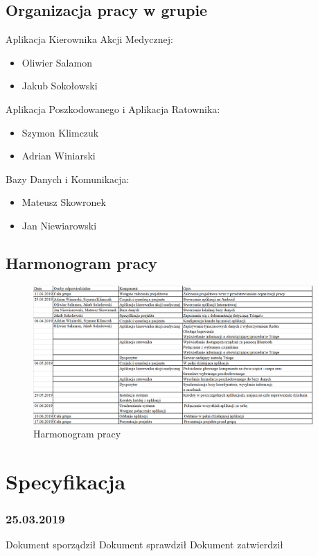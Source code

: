 \documentclass[11pt]{report}
\begin{document}
\subsection{Organizacja pracy w grupie}
Aplikacja Kierownika Akcji Medycznej:
\begin{itemize}
    \item Oliwier Salamon
    \item Jakub Sokołowski
\end{itemize}
Aplikacja Poszkodowanego i Aplikacja Ratownika:
\begin{itemize}
    \item Szymon Klimczuk
    \item Adrian Winiarski
\end{itemize}
Bazy Danych i Komunikacja:
\begin{itemize}
    \item Mateusz Skowronek
    \item Jan Niewiarowski
\end{itemize}

\subsection{Harmonogram pracy}
\begin{figure}[h!]
  \centering
    \includegraphics[width=0.95\textwidth]{img/harmonogram.png}
  \caption{Harmonogram pracy} 
  \label{fig:org}                                       
\end{figure}

\section{Specyfikacja}
\subsubsection{25.03.2019}




Dokument sporządził \hspace{1cm} Dokument sprawdził\hspace{1cm} Dokument zatwierdził 
\newline

 
\end{document}
